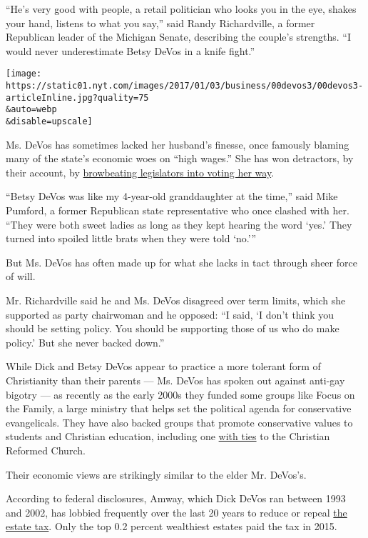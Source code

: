 ``He's very good with people, a retail politician who looks you in the
eye, shakes your hand, listens to what you say,'' said Randy
Richardville, a former Republican leader of the Michigan Senate,
describing the couple's strengths. ``I would never underestimate Betsy
DeVos in a knife fight.''

\texttt{[image: https://static01.nyt.com/images/2017/01/03/business/00devos3/00devos3-articleInline.jpg?quality=75\\\&auto=webp\\\&disable=upscale]}

Ms. DeVos has sometimes lacked her husband's finesse, once famously
blaming many of the state's economic woes on ``high wages.'' She has won
detractors, by their account, by
\href{https://www.nytimes.com/2016/11/23/us/politics/betsy-devos-trumps-education-pick-has-steered-money-from-public-schools.html?_r=0}{browbeating
legislators into voting her way}.

``Betsy DeVos was like my 4-year-old granddaughter at the time,'' said
Mike Pumford, a former Republican state representative who once clashed
with her. ``They were both sweet ladies as long as they kept hearing the
word `yes.' They turned into spoiled little brats when they were told
`no.'''

But Ms. DeVos has often made up for what she lacks in tact through sheer
force of will.

Mr. Richardville said he and Ms. DeVos disagreed over term limits, which
she supported as party chairwoman and he opposed: ``I said, `I don't
think you should be setting policy. You should be supporting those of us
who do make policy.' But she never backed down.''

While Dick and Betsy DeVos appear to practice a more tolerant form of
Christianity than their parents --- Ms. DeVos has spoken out against
anti-gay bigotry --- as recently as the early 2000s they funded some
groups like Focus on the Family, a large ministry that helps set the
political agenda for conservative evangelicals. They have also backed
groups that promote conservative values to students and Christian
education, including one
\href{https://www.crcna.org/news-and-views/worldwide-christian-schools-changes-its-name}{with
ties} to the Christian Reformed Church.

Their economic views are strikingly similar to the elder Mr. DeVos's.

According to federal disclosures, Amway, which Dick DeVos ran between
1993 and 2002, has lobbied frequently over the last 20 years to reduce
or repeal
\href{http://www.taxjusticeblog.org/archive/2015/03/the_three_fundamental_why_reas.php\#.WHPb-lMrJaR}{the
estate tax}. Only the top 0.2 percent wealthiest estates paid the tax in
2015.

